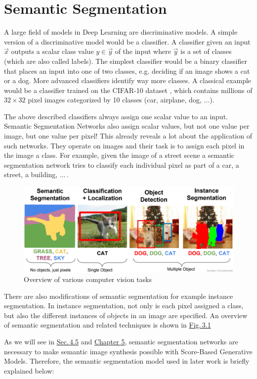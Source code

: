 
\section{Semantic Segmentation} \label{sec:3.1}
A large field of models in Deep Learning are discriminative models. A simple version of a discriminative model would be a classifier. A classifier given an input $\vec{x}$ outputs a scalar class value $y\in\vec{y}$ of the input where $\vec{y}$ is a set of classes (which are also called labels). The simplest classifier would be a binary classifier that places an input into one of two classes, e.g. deciding if an image shows a cat or a dog. More advanced classifiers identify way more classes. A classical example would be a classifier trained on the CIFAR-10 dataset \cite{cifar10}, which contains millions of $32\times32$ pixel images categorized by 10 classes (car, airplane, dog, $\dots$).

The above described classifiers always assign one scalar value to an input. Semantic Segmentation Networks also assign scalar values, but not one value per image, but one value per pixel! This already reveals a lot about the application of such networks. They operate on images and their task is to assign each pixel in the image a class. For example, given the image of a street scene a semantic segmentation network tries to classify each individual pixel as part of a car, a street, a building, $\dots$\,.
%
\begin{figure} \label{fig:3.2}
    \centering
    \includegraphics[width=.8\textwidth]{Chapters/figures/sem_seg.PNG}
    \caption{Overview of various computer vision tasks}
\end{figure}
%

There are also modifications of semantic segmentation for example instance segmentation. In instance segmentation, not only is each pixel assigned a class, but also the different instances of objects in an image are specified. An overview of semantic segmentation and related techniques is shown in \hyperref[fig:3.1]{Fig.\,3.1}

As we will see in \hyperref[sec:4.5]{Sec.\,4.5} and \hyperref[chap:5]{Chapter 5}, semantic segmentation networks are necessary to make semantic image synthesis possible with Score-Based Generative Models. Therefore, the semantic segmentation model used in later work is briefly explained below:
%
